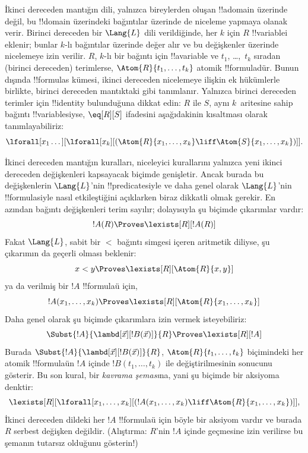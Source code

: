 



İkinci dereceden mantığın dili, yalnızca bireylerden oluşan !!a{domain}
üzerinde değil, bu !!{domain} üzerindeki bağıntılar üzerinde de niceleme
yapmaya olanak verir. Birinci dereceden bir $\Lang{L}$ dili verildiğinde, her
$k$ için $R$ !!{variable}{}i eklenir; bunlar $k$-lı bağıntılar üzerinde değer
alır ve bu değişkenler üzerinde nicelemeye izin verilir. $R$, $k$-lı bir bağıntı için
!!a{variable} ve $t_1$, \dots,~$t_k$ sıradan (birinci dereceden) terimlerse,
$\Atom{R}{t_1,\dots,t_k}$ atomik !!{formula}{}dür. Bunun dışında !!{formula}s
kümesi, ikinci dereceden nicelemeye ilişkin ek hükümlerle birlikte, birinci
dereceden mantıktaki gibi tanımlanır. Yalnızca birinci dereceden terimler için
!!{identity} bulunduğuna dikkat edin: $R$ ile $S$, aynı $k$~aritesine sahip
bağıntı !!{variable}s{}iyse, $\eq[R][S]$ ifadesini aşağıdakinin kısaltması olarak
tanımlayabiliriz:
\[
\lforall[x_1 \dots][\lforall[x_k][(\Atom{R}{x_1, \dots, x_k} \liff
  \Atom{S}{x_1, \dots, x_k})]].
\]

İkinci dereceden mantığın kuralları, niceleyici kurallarını yalnızca yeni
ikinci dereceden değişkenleri kapsayacak biçimde genişletir. Ancak burada bu
değişkenlerin $\Lang{L}$'nin !!{predicate}s{}iyle ve daha genel olarak
$\Lang{L}$'nin !!{formula}s{}iyle nasıl etkileştiğini açıklarken biraz dikkatli
olmak gerekir. En azından bağıntı değişkenleri terim sayılır; dolayısıyla şu
biçimde çıkarımlar vardır:
\[
!A(R) \Proves \lexists[R][!A(R)]
\]
Fakat $\Lang{L}$, sabit bir $<$ bağıntı simgesi içeren aritmetik diliyse, şu
çıkarımın da geçerli olması beklenir:
\[
x < y \Proves \lexists[R][\Atom{R}{x,y}]
\]
ya da verilmiş bir $!A$ !!{formula}{}ü için,
\[
!A(x_1, \dots, x_k) \Proves \lexists[R][\Atom{R}{x_1,\dots,x_k}]
\]
Daha genel olarak şu biçimde çıkarımlara izin vermek isteyebiliriz:
\[
\Subst{!A}{\lambd[\vec x][!B(\vec x)]}{R} \Proves
\lexists[R][!A]
\]
Burada $\Subst{!A}{\lambd[\vec x][!B(\vec x)]}{R}$,
$\Atom{R}{t_1,\dots,t_k}$ biçimindeki her atomik !!{formula}{}ün $!A$ içinde
$!B(t_1, \dots, t_k)$ ile değiştirilmesinin sonucunu gösterir. Bu son kural,
bir {\em kavrama şeması}na, yani şu biçimde bir aksiyoma denktir:
\[
\lexists[R][\lforall[x_1, \dots, x_k][(!A(x_1, \dots, x_k) \liff
\Atom{R}{x_1, \dots, x_k})]],
\]
İkinci dereceden dildeki her $!A$ !!{formula}{}ü için böyle bir aksiyom vardır
ve burada $R$ serbest değişken değildir. (Alıştırma: $R$'nin $!A$ içinde
geçmesine izin verilirse bu şemanın tutarsız olduğunu gösterin!)

